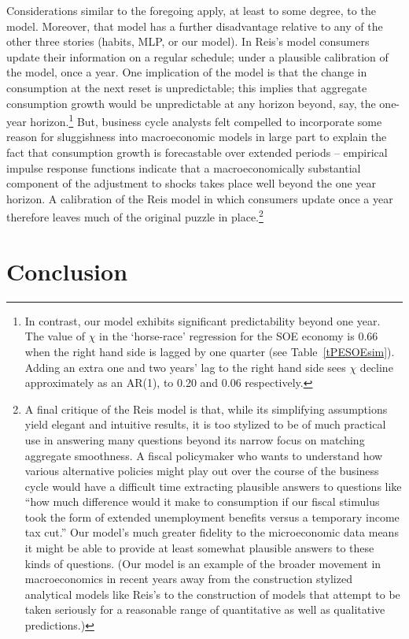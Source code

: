 \documentclass[titlepage]{\econtex}\newcommand{\texname}{cAndCwithStickyE}
\begin{document}
Considerations similar to the foregoing apply, at least to some degree, to the \cite{reis:inattentive} model.  Moreover, that model has a further disadvantage relative to any of the other three stories (habits, MLP, or our model). In Reis's model consumers update their information on a regular schedule; under a plausible calibration of the model, once a year. One implication of the model is that the change in consumption at the next reset is unpredictable; this implies that aggregate consumption growth would be unpredictable at any horizon beyond, say, the one-year horizon.\footnote{In contrast, our model exhibits significant predictability beyond one year. The value of $\chi$ in the `horse-race' regression for the SOE economy is 0.66 when the right hand side is lagged by one quarter (see Table~\ref{tPESOEsim}). Adding an extra one and two years' lag to the right hand side sees $\chi$ decline approximately as an AR(1), to 0.20 and 0.06 respectively.}  But, business cycle analysts felt compelled to incorporate some reason for sluggishness into macroeconomic models in large part to explain the fact that consumption growth is forecastable over extended periods -- empirical impulse response functions indicate that a macroeconomically substantial component of the adjustment to shocks takes place well beyond the one year horizon.  A calibration of the Reis model in which consumers update once a year therefore leaves much of the original puzzle in place.\footnote{A final critique of the Reis model is that, while its simplifying assumptions yield elegant and intuitive results, it is too stylized to be of much practical use in answering many questions beyond its narrow focus on matching aggregate smoothness.  A fiscal policymaker who wants to understand how various alternative policies might play out over the course of the business cycle would have a difficult time extracting plausible answers to questions like ``how much difference would it make to consumption if our fiscal stimulus took the form of extended unemployment benefits versus a temporary income tax cut.''  Our model's much greater fidelity to the microeconomic data means it might be able to provide at least somewhat plausible answers to these kinds of questions.  (Our model is an example of the broader movement in macroeconomics in recent years away from the construction stylized analytical models like Reis's to the construction of models that attempt to be taken seriously for a reasonable range of quantitative as well as qualitative predictions.)}


\section{Conclusion} \label{sec:Conclusion}
\end{document}
